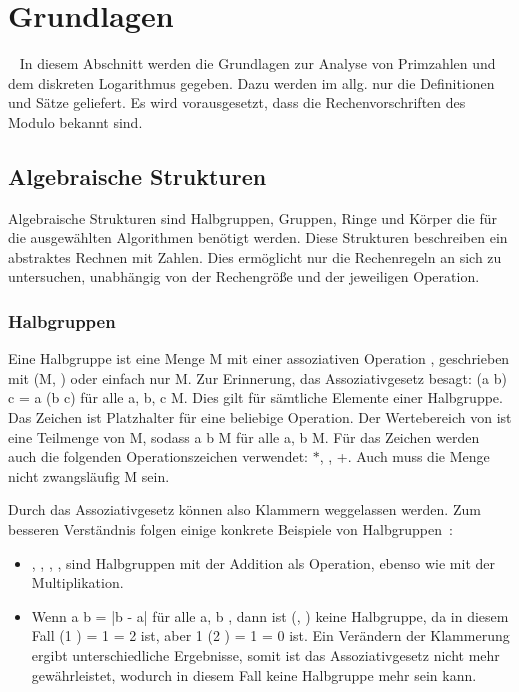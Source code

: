 \section*{Grundlagen}~\label{Kapitel Grundlagen}
	\wup In diesem Abschnitt werden die Grundlagen zur Analyse von Primzahlen und dem diskreten Logarithmus gegeben. Dazu werden im allg. nur die Definitionen und Sätze geliefert. Es wird vorausgesetzt, dass die Rechenvorschriften des Modulo bekannt sind.
	
	\subsection*{Algebraische Strukturen}

		Algebraische Strukturen sind Halbgruppen, Gruppen, Ringe und Körper die für die ausgewählten Algorithmen benötigt werden. Diese Strukturen beschreiben ein abstraktes Rechnen mit Zahlen. Dies ermöglicht nur die Rechenregeln an sich zu untersuchen, unabhängig von der Rechengröße und der jeweiligen Operation.
	
		\subsubsection*{Halbgruppen}
			Eine Halbgruppe ist eine Menge M mit einer assoziativen Operation \mycircOhne, geschrieben mit (M, \mycircOhne) oder einfach nur M. Zur Erinnerung, das Assoziativgesetz besagt: (a \mycirc b) \mycirc c = a \mycirc (b \mycirc c) für alle a, b, c \myin M. Dies gilt für sämtliche Elemente einer Halbgruppe. Das Zeichen \mycirc ist Platzhalter für eine beliebige Operation. Der Wertebereich von \mycirc ist eine Teilmenge von M, sodass a \mycirc b \myin M für alle a, b \myin M. Für das Zeichen \mycirc werden auch die folgenden Operationszeichen verwendet: $*$, \mycdotOhne, +. Auch muss die Menge nicht zwangsläufig M sein.~\cite{Erste:Hilfe:in:Linearer:Algebra}
		
			\wup Durch das Assoziativgesetz können also Klammern weggelassen werden. Zum besseren Verständnis folgen einige konkrete Beispiele von Halbgruppen~\cite{Erste:Hilfe:in:Linearer:Algebra}:
		
			\begin{itemize}
				\item {}, , , ,  sind Halbgruppen mit der Addition als Operation, ebenso wie mit der Multiplikation.
				\item Wenn a \mycirc b = |b - a| für alle a, b \myin \myMenge{Z}, dann ist (, \mycircOhne) keine Halbgruppe, da in diesem Fall (1 ) \mycirc 3 = 1  = 2 ist, aber 1 \mycirc (2 ) = 1  = 0 ist. Ein Verändern der Klammerung ergibt unterschiedliche Ergebnisse, somit ist das Assoziativgesetz nicht mehr gewährleistet, wodurch  in diesem Fall keine Halbgruppe mehr sein kann.
			\end{itemize}
			
